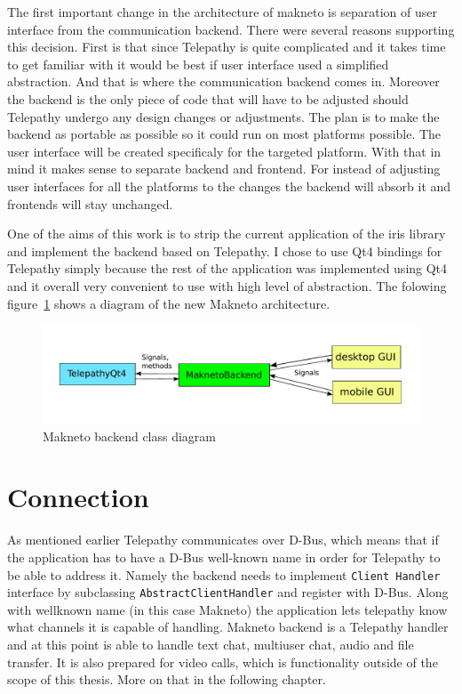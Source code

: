 The first important change in the architecture of makneto is separation of user interface from the communication backend. There were several reasons supporting this decision. First is that since Telepathy is quite complicated and it takes time to get familiar with it would be best if user interface used a simplified abstraction. And that is where the communication backend comes in. Moreover the backend is the only piece of code that will have to be adjusted should Telepathy undergo any design changes or adjustments. The plan is to make the backend as portable as possible so it could run on most platforms possible. The user interface will be created specificaly for the targeted platform. With that in mind it makes sense to separate backend and frontend. For instead of adjusting user interfaces for all the platforms to the changes the backend will absorb it and frontends will stay unchanged. 

One of the aims of this work is to strip the current application of the iris library and implement the backend based on Telepathy. I chose to use Qt4 bindings for Telepathy simply because the rest of the application was implemented using Qt4 and it overall very convenient to use with high level of abstraction.	The folowing figure~\ref{fig:MaknetoArchitectureDiagram} shows a diagram of the new Makneto architecture. 

\begin{figure}[ht]
	\begin{center}
	\includegraphics[width=15cm]{fig/maknetoArchitecture}
	\caption{Makneto backend class diagram}
	\label{fig:MaknetoArchitectureDiagram}
\end{center}
\end{figure}

\section{Connection}
As mentioned earlier Telepathy communicates over D-Bus, which means that if the application has to have a D-Bus well-known name in order for Telepathy to be able to address it.	Namely the backend needs to implement \verb|Client Handler| interface by subclassing \verb|AbstractClientHandler| and register with D-Bus. Along with wellknown name (in this case Makneto) the application lets telepathy know what channels it is capable of handling. Makneto backend is a Telepathy handler and at this point is able to handle text chat, multiuser chat, audio and file transfer. It is also prepared for video calls, which is functionality outside of the scope of this thesis. More on that in the following chapter. 

